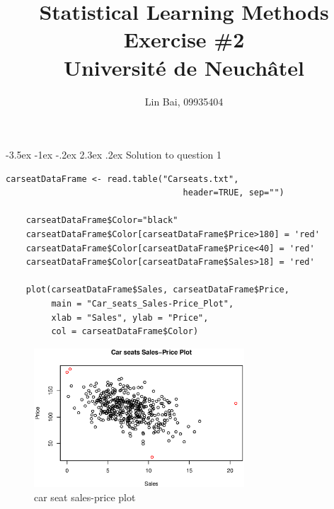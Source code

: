 \documentclass[12pt]{article}
\makeatletter
\renewcommand\section{\@startsection {section}{1}{\z@}%
	{-3.5ex \@plus -1ex \@minus -.2ex}%
	{2.3ex \@plus.2ex}%
	{\normalfont\large\bfseries}}%
\makeatother
\begin{document}
	
	
	
	\title{\textbf{Statistical Learning Methods Exercise \#{2}}\\
	Universit{\'e} de Neuch\^{a}tel}%
	\author{{Lin Bai, 09935404}} %
	
	\maketitle

	\section{Solution to question 1}
	\lstset{language=R}
	\lstset{frame=lines}
	\lstset{basicstyle=\footnotesize\ttfamily}
	\begin{lstlisting}[breaklines=true]
	carseatDataFrame <- read.table("Carseats.txt", 
	                               header=TRUE, sep="")
	
	carseatDataFrame$Color="black"
	carseatDataFrame$Color[carseatDataFrame$Price>180] = 'red'
	carseatDataFrame$Color[carseatDataFrame$Price<40] = 'red'
	carseatDataFrame$Color[carseatDataFrame$Sales>18] = 'red'
	
	plot(carseatDataFrame$Sales, carseatDataFrame$Price, 
	     main = "Car_seats_Sales-Price_Plot", 
	     xlab = "Sales", ylab = "Price", 
	     col = carseatDataFrame$Color)
	\end{lstlisting}
	
	\begin{figure}[htbp]
		\centering
		\includegraphics[width=0.7\textwidth]{figure1.eps}
		\caption{car seat sales-price plot}
	\end{figure}
\newpage
\end{document}
